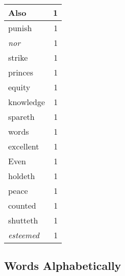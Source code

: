\begin{center}
\begin{longtable}{l|r}
Also & 1\\ \hline 
punish & 1\\ \hline 
\emph{nor} & 1\\ \hline 
strike & 1\\ \hline 
princes & 1\\ \hline 
equity & 1\\ \hline 
knowledge & 1\\ \hline 
spareth & 1\\ \hline 
words & 1\\ \hline 
excellent & 1\\ \hline 
Even & 1\\ \hline 
holdeth & 1\\ \hline 
peace & 1\\ \hline 
counted & 1\\ \hline 
shutteth & 1\\ \hline 
\emph{esteemed} & 1\\ \hline 
\end{longtable}  
\end{center}  


  
\normalsize  

  
  


\subsection{Words Alphabetically}

